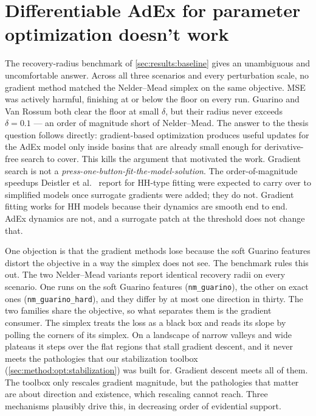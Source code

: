 \section{Differentiable AdEx for parameter optimization doesn't work}\label{sec:discussion:diffadex}

The recovery-radius benchmark of \cref{sec:results:baseline} gives an unambiguous and uncomfortable answer.
Across all three scenarios and every perturbation scale, no gradient method matched the Nelder--Mead simplex on the same objective.
\gls{MSE} was actively harmful, finishing at or below the floor on every run.
Guarino and Van Rossum both clear the floor at small $\delta$, but their radius never exceeds $\delta=0.1$ --- an order of magnitude short of Nelder--Mead.
The answer to the thesis question follows directly: gradient-based optimization produces useful updates for the \gls{AdEx}
model only inside basins that are already small enough for derivative-free search to cover.
This kills the argument that motivated the work.
Gradient search is not a \emph{press-one-button-fit-the-model-solution}.
The order-of-magnitude speedups Deistler et al.~\cite{Deistler2025} report for \gls{HH}-type fitting were expected to carry over to simplified models once surrogate gradients were added; they do not.
Gradient fitting works for \gls{HH} models because their dynamics are smooth end to end.
\gls{AdEx} dynamics are not, and a surrogate patch at the threshold does not change that.

One objection is that the gradient methods lose because the soft Guarino features distort the objective in a way the simplex does not see.
The benchmark rules this out.
The two Nelder--Mead variants report identical recovery radii on every scenario.
One runs on the soft Guarino features (\texttt{nm\_guarino}), the other on exact ones (\texttt{nm\_guarino\_hard}), and they differ by at most one direction in thirty.
The two families share the objective, so what separates them is the gradient consumer.
The simplex treats the loss as a black box and reads its slope by polling the corners of its simplex.
On a landscape of narrow valleys and wide plateaus it steps over the flat regions that stall gradient descent,
and it never meets the pathologies that our stabilization toolbox (\cref{sec:method:opt:stabilization}) was built for.
Gradient descent meets all of them.
The toolbox only rescales gradient magnitude, but the pathologies that matter are about direction and existence, which rescaling cannot reach.
Three mechanisms plausibly drive this, in decreasing order of evidential support.

